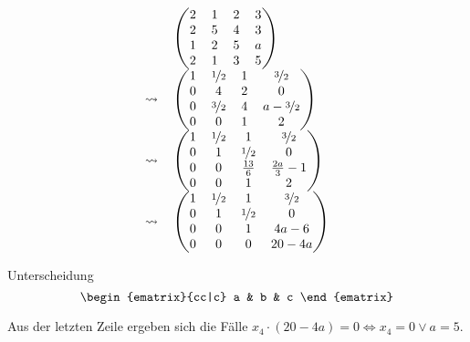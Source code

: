 \documentclass[main.tex]{subfiles}
\begin{document}
\begin{gather*}
    \arraycolsep=0.6em
    \begin{array}{ r l }
        & \begin{pmatrix}
            2 & 1 & 2 & 3 \\
            2 & 5 & 4 & 3 \\
            1 & 2 & 5 & a \\
            2 & 1 & 3 & 5
        \end{pmatrix}\\
        \rightsquigarrow &
        \begin{pmatrix}
            1 & \nicefrac{1}{2} & 1 & \nicefrac{3}{2} \\
            0 &   4 & 2 &   0 \\
            0 & \nicefrac{3}{2} & 4 & a - \nicefrac{3}{2} \\
            0 &   0 & 1 &   2
        \end{pmatrix}\\
        \rightsquigarrow &
        \begin{pmatrix}
            1 & \nicefrac{1}{2} & 1 & \nicefrac{3}{2} \\
            0 & 1 & \nicefrac{1}{2} & 0 \\
            0 & 0 & \frac{13}{6} & \frac{2a}{3} - 1 \\
            0 & 0 & 1 & 2
        \end{pmatrix}\\
        \rightsquigarrow &
        \begin{pmatrix}
            1 & \nicefrac{1}{2} & 1 & \nicefrac{3}{2} \\
            0 & 1 & \nicefrac{1}{2} & 0 \\
            0 & 0 & 1 & 4a - 6 \\
            0 & 0 & 0 & 20 - 4a
        \end{pmatrix}
    \end{array}
\end{gather*}


Unterscheidung 
$$
    \begin{ematrix}{cc|c}
        a & b & c
    \end{ematrix}
$$

Aus der letzten Zeile ergeben sich die Fälle
$x_4 \cdot (20-4a) = 0 \Leftrightarrow x_4 = 0 \vee  a = 5$.\\
\end{document}
